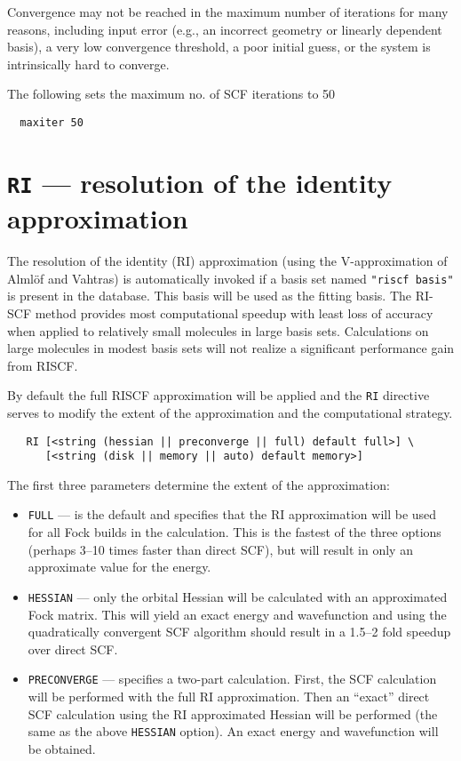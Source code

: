 \fussy

Convergence may not be reached in the maximum number of iterations for
many reasons, including input error (e.g., an incorrect geometry or
linearly dependent basis), a very low convergence threshold, a poor
initial guess, or the system is intrinsically hard to converge. 

The following sets the maximum no. of SCF iterations to 50
\begin{verbatim}
  maxiter 50
\end{verbatim}

\section{{\tt RI} --- resolution of the identity approximation}
\label{sec:riscf}

The resolution of the identity (RI) approximation (using the
V-approximation of Alml\"{o}f and Vahtras) is automatically invoked if
a basis set named \verb+"riscf basis"+ is present in the database.
This basis will be used as the fitting basis.  The RI-SCF method
provides most computational speedup with least loss of accuracy when
applied to relatively small molecules in large basis sets.
Calculations on large molecules in modest basis sets will not realize
a significant performance gain from RISCF.

By default the full RISCF approximation will be applied and the
\verb+RI+ directive serves to modify the extent of the approximation
and the computational strategy.

\begin{verbatim}
   RI [<string (hessian || preconverge || full) default full>] \
      [<string (disk || memory || auto) default memory>]
\end{verbatim}

The first three parameters determine the extent of the approximation:
\begin{itemize} 
\item \verb+FULL+ --- is the default and specifies that the RI
  approximation will be used for all Fock builds in the calculation.
  This is the fastest of the three options (perhaps 3--10 times faster
  than direct SCF), but will result in only an approximate value for
  the energy.

\item \verb+HESSIAN+ --- only the orbital Hessian will be calculated
  with an approximated Fock matrix.  This will yield an exact energy
  and wavefunction and using the quadratically convergent SCF
  algorithm should result in a 1.5--2 fold speedup over direct SCF.

\item \verb+PRECONVERGE+ --- specifies a two-part calculation.  First,
  the SCF calculation will be performed with the full RI
  approximation.  Then an ``exact'' direct SCF calculation using the
  RI approximated Hessian will be performed (the same as the above
  \verb+HESSIAN+ option).  An exact energy and wavefunction will be
  obtained.
\end{itemize}

